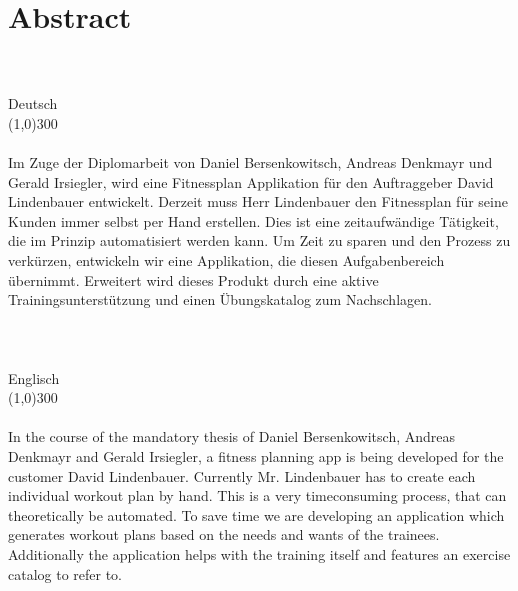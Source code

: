 \documentclass[FIPLY_base.tex]{subfiles}
\begin{document}
	\section{Abstract}
	\ \\
	\ \\
	{\LARGE Deutsch}
	\ \\
	\line(1,0){300}
	\ \\
	\ \\
	Im Zuge der Diplomarbeit von Daniel Bersenkowitsch, Andreas Denkmayr und Gerald Irsiegler, wird eine Fitnessplan Applikation für den Auftraggeber David Lindenbauer entwickelt. Derzeit muss Herr Lindenbauer den Fitnessplan für seine Kunden immer selbst per Hand erstellen. Dies ist eine zeitaufwändige Tätigkeit, die im Prinzip automatisiert werden kann. Um Zeit zu sparen und den Prozess zu verkürzen, entwickeln wir eine Applikation, die diesen Aufgabenbereich übernimmt. Erweitert wird dieses Produkt durch eine aktive Trainingsunterstützung und einen Übungskatalog zum Nachschlagen. 
	\ \\
	\ \\
	\ \\
	\ \\
	{\LARGE Englisch}
	\ \\
	\line(1,0){300}
	\ \\ 
	\ \\
	In the course of the mandatory thesis of Daniel Bersenkowitsch, Andreas Denkmayr and Gerald Irsiegler, a fitness planning app is being developed for the customer David Lindenbauer. Currently Mr. Lindenbauer has to create each individual workout plan by hand. This is a very timeconsuming process, that can theoretically be automated. To save time we are developing an application which generates workout plans based on the needs and wants of the trainees. Additionally the application helps with the training itself and features an exercise catalog to refer to.
\end{document}
